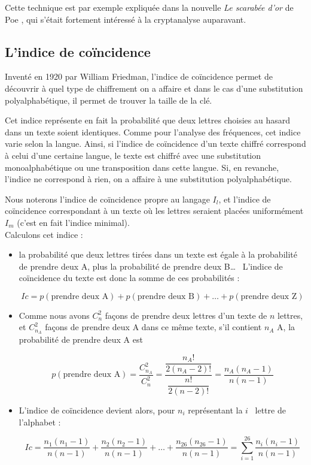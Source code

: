 Cette technique est par exemple expliquée dans la nouvelle
\emph{Le scarabée d'or} de Poe \cite{Poe}, qui s'était fortement 
intéressé à la cryptanalyse auparavant.


\subsection{L'indice de coïncidence}
Inventé en 1920 par William Friedman, l'indice de coïncidence
permet de découvrir à quel type de chiffrement on a affaire 
et dans le cas d'une
substitution polyalphabétique, il permet de trouver la taille de
la clé.

Cet indice représente en fait la probabilité que deux lettres
choisies au hasard dans un texte soient identiques. Comme pour
l'analyse des fréquences, cet indice varie selon la langue.
Ainsi, si l'indice de coïncidence d'un texte chiffré correspond à
celui d'une certaine langue, le texte est chiffré avec une
substitution monoalphabétique ou une transposition dans cette 
langue. Si, en revanche, l'indice ne correspond à rien, on a affaire 
à une substitution polyalphabétique.

Nous noterons l'indice de coïncidence propre au langage $I_l$, et
l'indice de coïncidence correspondant à un texte où les lettres
seraient placées uniformément $I_m$ (c'est en fait l'indice
minimal). 
\\

Calculons cet indice :
\begin{itemize}
  \item la probabilité que deux lettres tirées dans un texte est
égale à la probabilité de prendre deux A, plus la probabilité de
prendre deux B\dots~ L'indice de coïncidence du texte est donc la
somme de ces probabilités :
  \begin{center}
    \[ Ic = p(\mbox{prendre deux A}) + p(\mbox{prendre deux B}) +
\dots + p(\mbox{prendre deux Z}) \]
  \end{center}
  \item Comme nous avons $C_{n}^2$ façons de prendre deux lettres
d'un texte de $n$ lettres, et $C_{n_A}^2$ façons de prendre deux A
dans ce même texte, s'il contient $n_A$ A, la probabilité de prendre 
deux A est
  \begin{center}
    \[ p(\mbox{prendre deux A}) = \dfrac{C_{n_A}^2}{C_{n}^2} =
\dfrac{\dfrac{n_A!}{2 (n_A - 2)!}}{\dfrac{n!}{2 (n - 2)!}} = 
\dfrac{n_A (n_A - 1)}{n (n - 1)} \]
  \end{center}
  \item L'indice de coïncidence devient alors, pour $n_i$
représentant la $i$\ieme~ lettre de l'alphabet :
  \begin{center}
    \[ Ic = \frac{n_1 (n_1 - 1)}{n (n - 1)} + \frac{n_2 (n_2 - 1)}{n
(n - 1)} + \dots + \frac{n_{26} (n_{26} - 1)}{n (n - 1)} = \sum_{i
= 1}^{26} \frac{n_i (n_i - 1)}{n (n - 1)} \] 
  \end{center}
\end{itemize}

